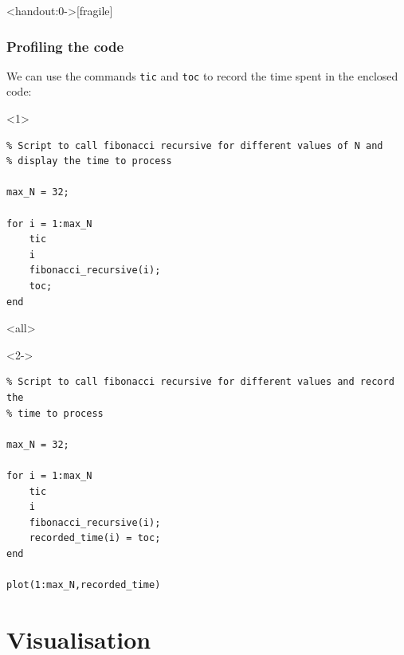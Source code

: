 \begin{frame}<handout:0->[fragile]
  \frametitle{Profiling the code}
  We can use the commands \lstinline$tic$ and \lstinline$toc$ to record the time spent in the enclosed code:
    \begin{onlyenv}<1>
      \lstset{showlines=true}
    \begin{lstlisting}
% Script to call fibonacci recursive for different values of N and 
% display the time to process

max_N = 32;

for i = 1:max_N
    tic
    i
    fibonacci_recursive(i);
    toc;
end
\end{lstlisting}
  \end{onlyenv}
  \mode<all>
  \begin{onlyenv}<2->
    \begin{lstlisting}
% Script to call fibonacci recursive for different values and record the
% time to process

max_N = 32;

for i = 1:max_N
    tic
    i
    fibonacci_recursive(i);
    recorded_time(i) = toc;
end

plot(1:max_N,recorded_time)
        \end{lstlisting}
      \end{onlyenv}
\end{frame}

\section{Visualisation}
